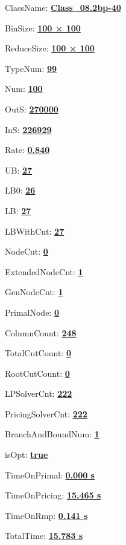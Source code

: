 \documentclass[11pt]{article}
\begin{document}
\pagestyle{empty}


ClassName: \underline{\textbf{Class_08.2bp-40}}
\par
BinSize: \underline{\textbf{100 × 100}}
\par
ReduceSize: \underline{\textbf{100 × 100}}
\par
TypeNum: \underline{\textbf{99}}
\par
Num: \underline{\textbf{100}}
\par
OutS: \underline{\textbf{270000}}
\par
InS: \underline{\textbf{226929}}
\par
Rate: \underline{\textbf{0.840}}
\par
UB: \underline{\textbf{27}}
\par
LB0: \underline{\textbf{26}}
\par
LB: \underline{\textbf{27}}
\par
LBWithCut: \underline{\textbf{27}}
\par
NodeCut: \underline{\textbf{0}}
\par
ExtendedNodeCnt: \underline{\textbf{1}}
\par
GenNodeCnt: \underline{\textbf{1}}
\par
PrimalNode: \underline{\textbf{0}}
\par
ColumnCount: \underline{\textbf{248}}
\par
TotalCutCount: \underline{\textbf{0}}
\par
RootCutCount: \underline{\textbf{0}}
\par
LPSolverCnt: \underline{\textbf{222}}
\par
PricingSolverCnt: \underline{\textbf{222}}
\par
BranchAndBoundNum: \underline{\textbf{1}}
\par
isOpt: \underline{\textbf{true}}
\par
TimeOnPrimal: \underline{\textbf{0.000 s}}
\par
TimeOnPricing: \underline{\textbf{15.465 s}}
\par
TimeOnRmp: \underline{\textbf{0.141 s}}
\par
TotalTime: \underline{\textbf{15.783 s}}
\par
\newpage


\end{document}
